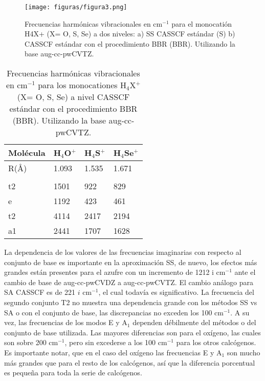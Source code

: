 \documentclass[12pt]{report}
\begin{document}
\begin{figure}[h]
\centering
\texttt{[image: figuras/figura3.png]} 
\caption{Frecuencias harmónicas vibracionales en cm$^{-1}$ para el monocatión H4X+ (X= O, S, Se) a dos niveles:  a) SS CASSCF estándar (S) b) CASSCF estándar con el procedimiento BBR (BBR). Utilizando la base aug-cc-pwCVTZ.}
\label{rmonocationes2}
\end{figure}

\newpage

\begin{table}[]
\centering
\begin{tabular}{l|l|l|l}
\hline
 Molécula &H$_4$O$^+$  & H$_4$S$^+$ & H$_4$Se$^+$ \\ \hline
R(\AA) & 1.093 & 1.535 & 1.671 \\ \hline
 &  &  &  \\
t2 &1501  & 922 & 829 \\ 
e & 1192 & 423 & 461 \\ 
t2 & 4114 & 2417 & 2194 \\ 
a1 & 2441 & 1707 &  1628 \\ \hline
\end{tabular}
\caption{Frecuencias harmónicas vibracionales en cm$^{-1}$ para los monocationes H$_4$X$^+$ (X= O, S, Se) a nivel CASSCF estándar con el procedimiento BBR (BBR). Utilizando la base aug-cc-pwCVTZ.}
\label{rmonocationest3}
\end{table}




La dependencia de los valores de las frecuencias imaginarias con respecto al conjunto de base es importante en la aproximación SS, de nuevo, los efectos más grandes están presentes para el azufre con un incremento de 1212 i cm$^{-1}$ ante el cambio de base de aug-cc-pwCVDZ a aug-cc-pwCVTZ. El cambio análogo para SA CASSCF es de 221 $i$ cm$^{-1}$, el cual todavía es significativo. La frecuencia del segundo conjunto T2 no muestra una dependencia grande con los métodos SS vs SA o con el conjunto de base, las discrepancias no exceden los 100 cm$^{-1}$. A su vez, las frecuencias de los modos E y A$_1$ dependen débilmente del métodos o del conjunto de base utilizada. Las mayores diferencias son para el oxígeno, las cuales son sobre 200 cm$^{-1}$, pero sin excederse a los 100 cm$^{-1}$ para los otros calcógenos. Es importante notar, que en el caso del oxígeno las frecuencias E y A$_1$ son mucho más grandes que para el resto de los calcógenos, así que la diferencia porcentual es pequeña para toda la serie de calcógenos.
\end{document}
